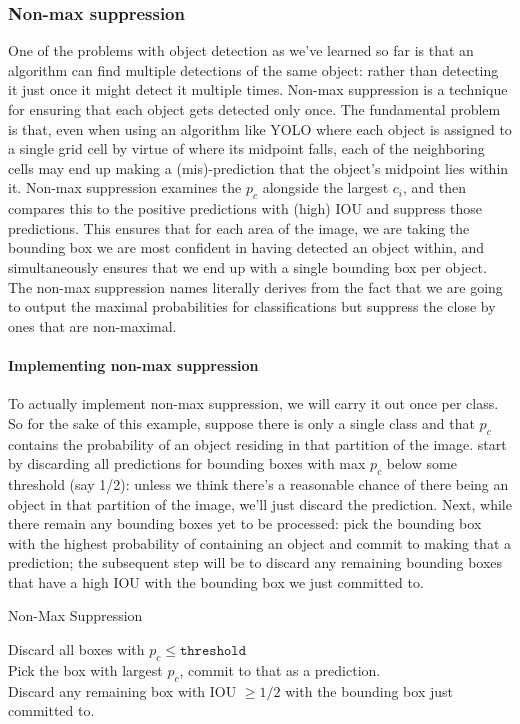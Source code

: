 \documentclass[12pt]{article}
\begin{document}
\subsubsection{Non-max suppression} One of the problems with object detection as we've learned so far is that an algorithm can find multiple detections of the same object: rather than detecting it just once it might detect it multiple times. Non-max suppression is a technique for ensuring that each object gets detected only once. The fundamental problem is that, even when using an algorithm like YOLO where each object is assigned to a single grid cell by virtue of where its midpoint falls, each of the neighboring cells may end up making a (mis)-prediction that the object's midpoint lies within it. Non-max suppression examines the $p_c$ alongside the largest $c_i$, and then compares this to the positive predictions with (high) IOU and suppress those predictions. This ensures that for each area of the image, we are taking the bounding box we are most confident in having detected an object within, and simultaneously ensures that we end up with a single bounding box per object. The non-max suppression names literally derives from the fact that we are going to output the maximal probabilities for classifications but suppress the close by ones that are non-maximal.

\paragraph{Implementing non-max suppression} To actually implement non-max suppression, we will carry it out once per class. So for the sake of this example, suppose there is only a single class and that $p_c$ contains the probability of an object residing in that partition of the image. start by discarding all predictions for bounding boxes with
max $p_c$ below some threshold (say 1/2): unless we think there's a reasonable chance of there being an object in that partition of the image, we'll just discard the prediction. Next, while there remain any bounding boxes yet to be processed: pick the bounding box with the highest probability of containing an object and commit to making that a prediction; the subsequent step will be to discard any remaining bounding boxes that have a high IOU with the bounding box we just committed to.
\begin{algorithm}
  \caption{Non-Max Suppression}
  Discard all boxes with $p_c \leq \texttt{threshold}$ \\
   {
    Pick the box with largest $p_c$, commit to that as a prediction. \\
    Discard any remaining box with IOU $\geq 1/2$ with the bounding box just     committed to.
  }
\end{algorithm}
\end{document}
